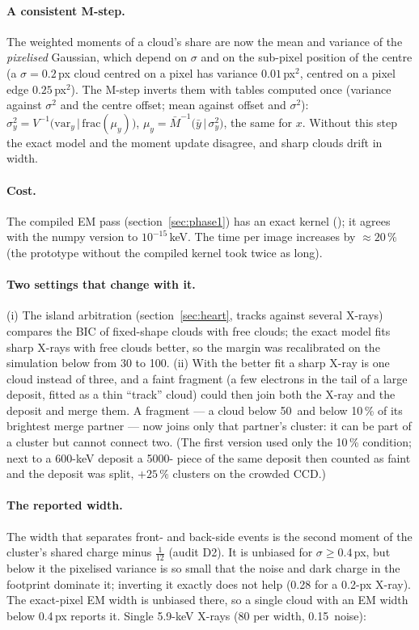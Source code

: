 \paragraph{A consistent M-step.} The weighted moments of a cloud's share are now the mean and variance of the
\emph{pixelised} Gaussian, which depend on $\sigma$ and on the sub-pixel position of the centre (a $\sigma=0.2$\,px cloud
centred on a pixel has variance $0.01$\,px$^2$, centred on a pixel edge $0.25$\,px$^2$). The M-step inverts them
with tables computed once (variance against $\sigma^2$ and the centre offset; mean against offset and $\sigma^2$):
$\sigma^2_{y}=V^{-1}\big(\mathrm{var}_y\,|\,\mathrm{frac}(\mu_y)\big)$, $\mu_y=\bar M^{-1}\big(\bar y\,|\,\sigma_y^2\big)$, the
same for $x$. Without this step the exact model and the moment update disagree, and sharp clouds drift in width.

\paragraph{Cost.} The compiled EM pass (section~\ref{sec:phase1}) has an exact kernel (); it agrees with
the numpy version to $10^{-15}$\,keV. The time per image increases by $\approx20\,\%$ (the prototype without the compiled
kernel took twice as long).

\paragraph{Two settings that change with it.} (i) The island arbitration (section~\ref{sec:heart}, tracks against several
X-rays) compares the BIC of fixed-shape clouds with free clouds; the exact model fits sharp X-rays with free clouds
better, so the margin was recalibrated on the simulation below from 30 to 100. (ii) With the better fit a sharp
X-ray is one cloud instead of three, and a faint fragment (a few electrons in the tail of a large deposit, fitted as a thin
``track'' cloud) could then join both the X-ray and the deposit and merge them. A fragment --- a cloud below 50\,\el{} and below 10\,\% of its
brightest merge partner --- now joins only that partner's cluster: it can be part of a cluster but cannot connect two.
(The first version used only the 10\,\% condition; next to a 600-keV deposit a 5000-\el{} piece of the same deposit then
counted as faint and the deposit was split, $+25\,\%$ clusters on the crowded CCD.)

\paragraph{The reported width.} The width that separates front- and back-side events is the second moment of the
cluster's shared charge minus $\tfrac1{12}$ (audit D2). It is unbiased for $\sigma\ge0.4$\,px, but below it the pixelised
variance is so small that the noise and dark charge in the footprint dominate it; inverting it exactly does not help
(0.28 for a 0.2-px X-ray). The exact-pixel EM width is unbiased there, so a single cloud with an EM width below 0.4\,px reports
it. Single 5.9-keV X-rays (80 per width, 0.15\,\el{} noise):

